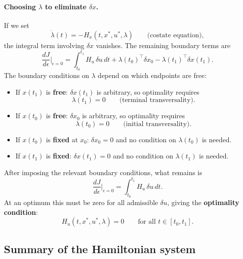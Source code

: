 \documentclass[12pt,a4paper]{article}
\theoremstyle{definition}
\theoremstyle{plain}
\theoremstyle{remark}
\begin{document}
\paragraph{Choosing $\lambda$ to eliminate $\delta x$.}
If we set
\begin{equation}
\label{eq:abstract_costate}
  \dot{\lambda}(t) = -H_x(t, x^*, u^*, \lambda) \qquad \text{(costate equation)},
\end{equation}
the integral term involving $\delta x$ vanishes. The remaining boundary terms are
\[
  \frac{dJ}{d\epsilon}\bigg|_{\epsilon=0} = \int_{t_0}^{t_1} H_u\,\delta u\, dt + \lambda(t_0)^\top \delta x_0 - \lambda(t_1)^\top \delta x(t_1).
\]
The boundary conditions on $\lambda$ depend on which endpoints are free:
\begin{itemize}[leftmargin=2em]
  \item If $x(t_1)$ is \textbf{free}: $\delta x(t_1)$ is arbitrary, so optimality requires
    \begin{equation}
    \label{eq:abstract_transversality}
      \lambda(t_1) = 0 \qquad \text{(terminal transversality)}.
    \end{equation}
  \item If $x(t_0)$ is \textbf{free}: $\delta x_0$ is arbitrary, so optimality requires
    \begin{equation}
    \label{eq:abstract_transversality_initial}
      \lambda(t_0) = 0 \qquad \text{(initial transversality)}.
    \end{equation}
  \item If $x(t_0)$ is \textbf{fixed} at $x_0$: $\delta x_0 = 0$ and no condition on $\lambda(t_0)$ is needed.
  \item If $x(t_1)$ is \textbf{fixed}: $\delta x(t_1) = 0$ and no condition on $\lambda(t_1)$ is needed.
\end{itemize}
After imposing the relevant boundary conditions, what remains is
\[
  \frac{dJ}{d\epsilon}\bigg|_{\epsilon=0} = \int_{t_0}^{t_1} H_u\,\delta u\, dt.
\]
At an optimum this must be zero for all admissible $\delta u$, giving the \textbf{optimality condition}:
\begin{equation}
\label{eq:abstract_Hu}
  H_u(t, x^*, u^*, \lambda) = 0 \qquad \text{for all } t \in [t_0, t_1].
\end{equation}

\subsection{Summary of the Hamiltonian system}
\end{document}
